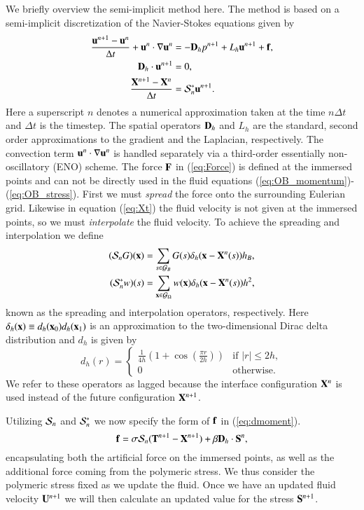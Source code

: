 We briefly overview the semi-implicit method here. The method is based on a semi-implicit discretization of the Navier-Stokes equations given by
\begin{align}
\frac{\mathbf{u}^{n+1}-\mathbf{u}^n}{\Delta t} + \mathbf{u}^n\cdot\nabla\mathbf{u}^n &= -\mathbf{D}_h p^{n+1}+ L_h \mathbf{u}^{n+1} + \mathbf{f}, \label{eq:dmoment} \\
\mathbf{D}_h \cdot \mathbf{u}^{n+1} &= 0, \label{eq:ddivergence} \\
\frac{\mathbf{X}^{n+1}-\mathbf{X}^n}{\Delta t} &= \mathcal{S}^*_n\mathbf{u}^{n+1}. \label{eq:Xt}
\end{align}
Here a superscript $n$ denotes a numerical approximation taken at the time $n \Delta t$ and $\Delta t$ is the timestep. The spatial operators $\mathbf{D}_h$ and $L_h$ are the standard,  second order approximations to the gradient and the Laplacian, respectively. The convection term $\mathbf{u}^n\cdot\nabla\mathbf{u}^n$ is handled separately via a third-order essentially non-oscillatory (ENO) scheme.
The force $\mathbf{F}$ in (\ref{eq:Force}) is defined at the immersed points and can not be directly used in the fluid equations (\ref{eq:OB_momentum})-(\ref{eq:OB_stress}). First we must {\em spread} the force onto the surrounding Eulerian grid. Likewise in equation (\ref{eq:Xt}) the fluid velocity is not given at the immersed points, so we must {\em interpolate} the fluid velocity. To achieve the spreading and interpolation we define
\begin{align}
(\mathcal{S}_n G) (\mathbf{x})&= \sum_{s \in \mathcal{G}_B }G(s) \delta_h(\mathbf{x}-\mathbf{X}^n(s))h_B,
\label{eq:S} \\
(\mathcal{S}^*_n w)(s) &= \sum_{ \mathbf{x} \in \mathcal{G}_\Omega} w(\mathbf{x})\delta_h(\mathbf{x}-\mathbf{X}^n(s))h^2,
\label{eq:S*}
\end{align}
known as the spreading and interpolation operators, respectively.
Here $\delta_h(\mathbf{x}) \equiv d_h(\mathbf{x}_0)d_h(\mathbf{x}_1)$ is an approximation to the two-dimensional Dirac delta distribution and $d_h$ is given by
\begin{equation}
d_h(r) = \begin{cases}
\frac{1}{4h}\left( 1+\cos(\frac{\pi r}{2h})\right)& \textrm{if } |r|\leq 2h, \\
0& \textrm{otherwise}.
\end{cases}
\end{equation}
We refer to these operators as lagged because the interface configuration $\mathbf{X}^n$ is used 
instead of the future configuration $\mathbf{X}^{n+1}$.

Utilizing $\mathcal{S}_n$ and $\mathcal{S}^*_n$ we now specify the form of $\mathbf{f}$ in (\ref{eq:dmoment}).
\begin{equation}
\mathbf{f} = \sigma\mathcal{S}_n(\mathbf{T}^{n+1} - \mathbf{X}^{n+1}) + \beta\mathbf{D}_h\cdot\mathbf{S}^n,
\end{equation}
encapsulating both the artificial force on the immersed points, as well as the additional force coming from the polymeric stress. We thus consider the polymeric stress fixed as we update the fluid. Once we have an updated fluid velocity $\mathbf{U}^{n+1}$ we will then calculate an updated value for the stress $\mathbf{S}^{n+1}$.

